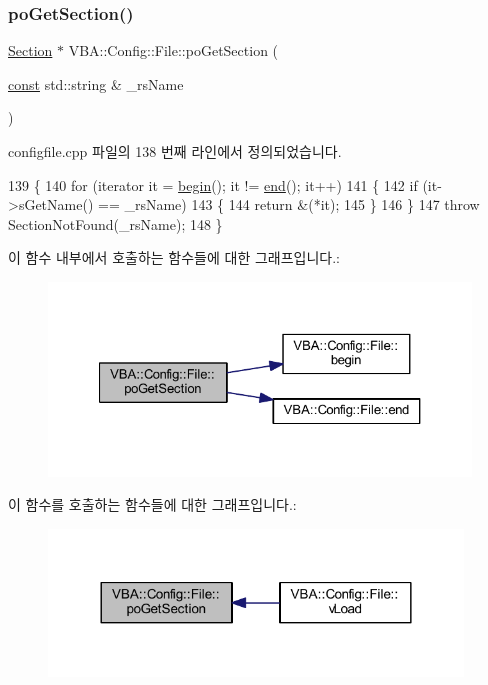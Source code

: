 \subsubsection{\texorpdfstring{po\+Get\+Section()}{poGetSection()}}
{\footnotesize\ttfamily \mbox{\hyperlink{class_v_b_a_1_1_config_1_1_section}{Section}} $\ast$ V\+B\+A\+::\+Config\+::\+File\+::po\+Get\+Section (\begin{DoxyParamCaption}\item[{\mbox{\hyperlink{getopt1_8c_a2c212835823e3c54a8ab6d95c652660e}{const}} std\+::string \&}]{\+\_\+rs\+Name }\end{DoxyParamCaption})}



configfile.\+cpp 파일의 138 번째 라인에서 정의되었습니다.


\begin{DoxyCode}
139 \{
140   \textcolor{keywordflow}{for} (iterator it = \mbox{\hyperlink{class_v_b_a_1_1_config_1_1_file_a4dd88e6aa71829ce332139028225efcf}{begin}}(); it != \mbox{\hyperlink{class_v_b_a_1_1_config_1_1_file_a809724e386bf59c8726c33e822890c70}{end}}(); it++)
141   \{
142     \textcolor{keywordflow}{if} (it->sGetName() == \_rsName)
143     \{
144       \textcolor{keywordflow}{return} &(*it);
145     \}
146   \}
147   \textcolor{keywordflow}{throw} SectionNotFound(\_rsName);
148 \}
\end{DoxyCode}
이 함수 내부에서 호출하는 함수들에 대한 그래프입니다.\+:
\nopagebreak
\begin{figure}[H]
\begin{center}
\leavevmode
\includegraphics[width=327pt]{class_v_b_a_1_1_config_1_1_file_a0de8f36155786c73b91a22e62df27958_cgraph}
\end{center}
\end{figure}
이 함수를 호출하는 함수들에 대한 그래프입니다.\+:
\nopagebreak
\begin{figure}[H]
\begin{center}
\leavevmode
\includegraphics[width=312pt]{class_v_b_a_1_1_config_1_1_file_a0de8f36155786c73b91a22e62df27958_icgraph}
\end{center}
\end{figure}
